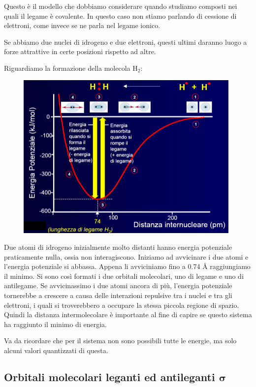Questo è il modello che dobbiamo considerare quando studiamo composti nei quali il legame è covalente. In questo caso non stiamo parlando di cessione di elettroni, come invece se ne parla nel legame ionico.

Se abbiamo due nuclei di idrogeno e due elettroni, questi ultimi daranno luogo a forze attrattive in certe posizioni rispetto ad altre.

\vspace{0.2cm}Riguardiamo la formazione della molecola H$_2$:

\begin{figure}[H]
    \centering
    \includegraphics[width=11cm]{immagini/legame_covalente_H_2.png}
\end{figure}

Due atomi di idrogeno inizialmente molto distanti hanno energia potenziale praticamente nulla, ossia non interagiscono. Iniziamo ad avvicinare i due atomi e l'energia potenziale si abbassa. Appena li avviciniamo fino a 0.74 Å raggiungiamo il minimo. Si sono così formati i due orbitali molecolari, uno di legame e uno di antilegame. Se avvicinassimo i due atomi ancora di più, l'energia potenziale tornerebbe a crescere a causa delle interazioni repulsive tra i nuclei e tra gli elettroni, i quali si troverebbero a occupare la stessa piccola regione di spazio. Quindi la distanza intermolecolare è importante al fine di capire se questo sistema ha raggiunto il minimo di energia.

Va da ricordare che per il sistema non sono possibili tutte le energie, ma solo alcuni valori quantizzati di questa.
\subsection{Orbitali molecolari leganti ed antileganti $\boldsymbol{\sigma}$}

